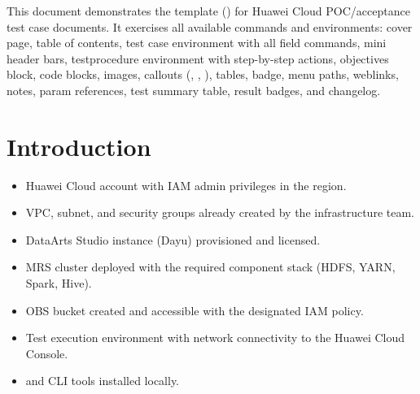 \documentclass{testbook}
\begin{document}
\makecover

\maketoc

\startbody

\begin{infobox}
This document demonstrates the  template () for
Huawei Cloud POC/acceptance test case documents. It exercises all available
commands and environments: cover page, table of contents, test case environment
with all field commands, mini header bars, testprocedure environment with
step-by-step actions, objectives block, code blocks, images, callouts
(, , ), tables, badge,
menu paths, weblinks, notes, param references, test summary table,
result badges, and changelog.
\end{infobox}

\section{Introduction}

\begin{objectives}

  \prerequisites
  \begin{itemize}
    \item Huawei Cloud account with IAM admin privileges in the  region.
    \item VPC, subnet, and security groups already created by the infrastructure team.
    \item DataArts Studio instance (Dayu) provisioned and licensed.
    \item MRS cluster deployed with the required component stack (HDFS, YARN, Spark, Hive).
    \item OBS bucket created and accessible with the designated IAM policy.
    \item Test execution environment with network connectivity to the Huawei Cloud Console.
    \item {} and  CLI tools installed locally.
  \end{itemize}
\end{objectives}
\end{document}
